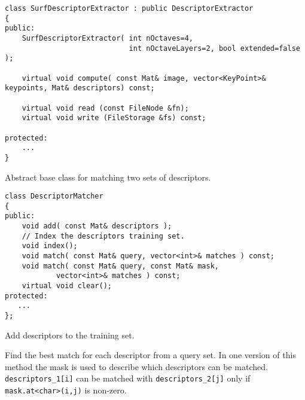 \begin{lstlisting}
class SurfDescriptorExtractor : public DescriptorExtractor
{
public:
    SurfDescriptorExtractor( int nOctaves=4,
                             int nOctaveLayers=2, bool extended=false );

    virtual void compute( const Mat& image, vector<KeyPoint>& keypoints, Mat& descriptors) const;

    virtual void read (const FileNode &fn);
    virtual void write (FileStorage &fs) const;
   
protected:
    ...
}
\end{lstlisting}

Abstract base class for matching two sets of descriptors.

\begin{lstlisting}
class DescriptorMatcher
{
public:
    void add( const Mat& descriptors );
    // Index the descriptors training set.
    void index();
    void match( const Mat& query, vector<int>& matches ) const;
    void match( const Mat& query, const Mat& mask,
	        vector<int>& matches ) const;
    virtual void clear();
protected:
   ...
};
\end{lstlisting} 

Add descriptors to the training set.


\begin{description}
\end{description}

Find the best match for each descriptor from a query set. In one version 
of this method the mask is used to describe which descriptors can be matched.
\texttt{descriptors\_1[i]} can be matched with \texttt{descriptors\_2[j]} only if \texttt{mask.at<char>(i,j)} is non-zero.


\begin{description}
\end{description}

